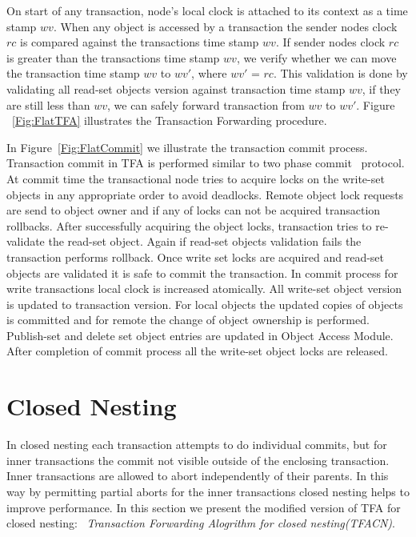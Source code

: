 \documentclass[12pt,english]{report}
\begin{document}
On start of any transaction, node's local clock is attached to its context as a time stamp $wv$. When any object is accessed by a transaction the sender nodes clock $rc$ is compared against the transactions time stamp $wv$. If sender nodes clock $rc$ is greater than the transactions time stamp $wv$, we verify whether we can move the transaction time stamp $wv$ to $wv'$, where $wv'$ = $rc$. This validation is done by validating all read-set objects version against transaction time stamp $wv$, if they are still less than $wv$, we can safely forward transaction from $wv$ to $wv'$. Figure ~\ref{Fig:FlatTFA} illustrates the Transaction Forwarding procedure.

In Figure~\ref{Fig:FlatCommit} we illustrate the transaction commit process. Transaction commit in TFA is performed similar to two phase commit~\cite{TwoPC:weikum1991principles} protocol. At commit time the transactional node tries to acquire locks on the write-set objects in any appropriate order to avoid deadlocks. Remote object lock requests are send to object owner and if any of locks can not be acquired transaction rollbacks. After successfully acquiring the object locks, transaction tries to re-validate the read-set object. Again if read-set objects validation fails the transaction performs rollback. Once write set locks are acquired and read-set objects are validated it is safe to commit the transaction. In commit process for write transactions local clock is increased atomically. All write-set object version is updated to transaction version. For local objects the updated copies of objects is committed and for remote the change of object ownership is performed. Publish-set and delete set object entries are updated in Object Access Module. After completion of commit process all the write-set object locks are released. 
   
\section{Closed Nesting} 

In closed nesting each transaction attempts to do individual commits, but for inner transactions the commit not visible outside of the enclosing transaction. Inner transactions are allowed to abort independently of their parents. In this way by permitting partial aborts for the inner transactions closed nesting helps to improve performance. In this section we present the modified version of TFA for closed nesting: ~\emph{Transaction Forwarding Alogrithm for closed nesting(TFACN)}.
\end{document}
